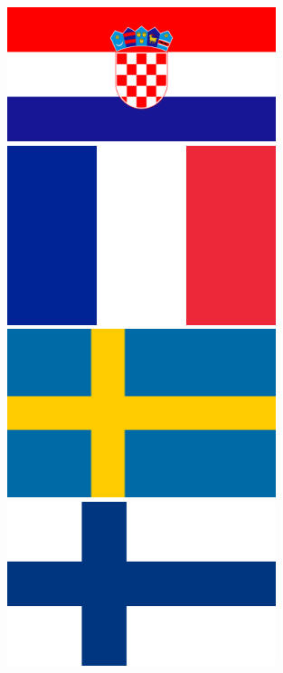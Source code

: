 \documentclass[12pt]{article}
\begin{document}
        \begin{figure} [h!]
            \begin{minipage}[c]{0.25\linewidth}
                \includegraphics[width=0.7\textwidth]{./Pictures/cro.png}
            \end{minipage}
            \hfill
            \begin{minipage}[c]{0.25\linewidth}
                \includegraphics[width=0.7\textwidth]{./Pictures/france.png}
            \end{minipage}
            \begin{minipage}[c]{0.25\linewidth}
                \hfill
                \includegraphics[width=0.7\textwidth]{./Pictures/sweden.png}
                \end{minipage}
                \begin{minipage}[c]{0.25\linewidth}
                \hfill
                \includegraphics[width=0.7\textwidth]{./Pictures/finland.png}
            \end{minipage}
        \end{figure}
\end{document}
